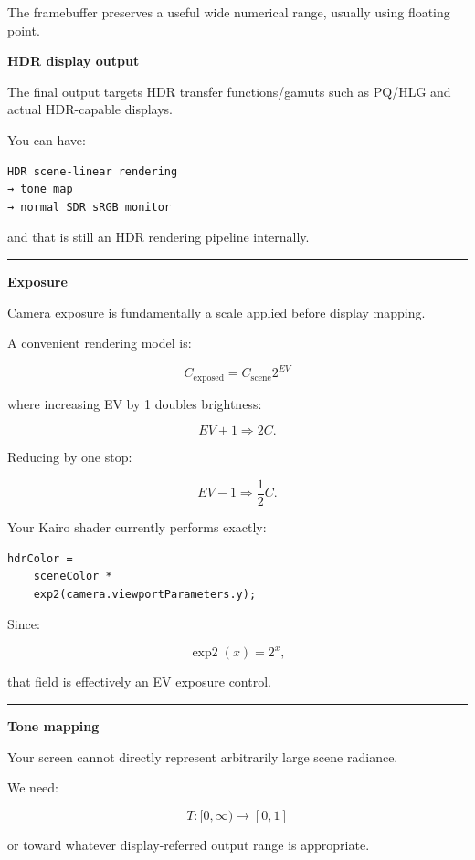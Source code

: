 The framebuffer preserves a useful wide numerical range, usually using floating point.

\textbf{HDR display output}

The final output targets HDR transfer functions/gamuts such as PQ/HLG and actual HDR-capable displays.

You can have:

\begin{verbatim}
HDR scene-linear rendering
→ tone map
→ normal SDR sRGB monitor
\end{verbatim}

and that is still an HDR rendering pipeline internally.

\begin{center}\rule{0.5\linewidth}{0.5pt}\end{center}

\textbf{Exposure}

Camera exposure is fundamentally a scale applied before display mapping.

A convenient rendering model is:

\[
\boxed{
C_{\text{exposed}}
=
C_{\text{scene}}2^{EV}
}
\]

where increasing EV by 1 doubles brightness:

\[
EV+1
\Rightarrow
2C.
\]

Reducing by one stop:

\[
EV-1
\Rightarrow
\frac12C.
\]

Your Kairo shader currently performs exactly:

\begin{verbatim}
hdrColor =
    sceneColor *
    exp2(camera.viewportParameters.y);
\end{verbatim}

Since:

\[
\operatorname{exp2}(x)=2^x,
\]

that field is effectively an EV exposure control.

\begin{center}\rule{0.5\linewidth}{0.5pt}\end{center}

\textbf{Tone mapping}

Your screen cannot directly represent arbitrarily large scene radiance.

We need:

\[
\boxed{
T:
[0,\infty)
\rightarrow
[0,1]
}
\]

or toward whatever display-referred output range is appropriate.

